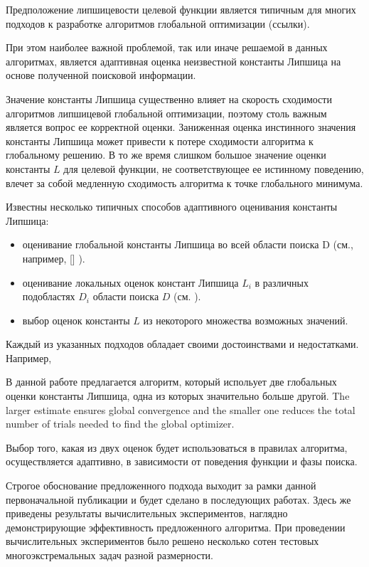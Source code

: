 \documentclass[runningheads]{llncs}
\begin{document}
Предположение липшицевости целевой функции является типичным для многих подходов к разработке алгоритмов глобальной оптимизации (ссылки). 


При этом наиболее важной проблемой, так или иначе решаемой в данных алгоритмах, является адаптивная оценка неизвестной константы Липшица на основе полученной поисковой информации. 

Значение константы Липшица существенно влияет на скорость сходимости алгоритмов липшицевой глобальной оптимизации, поэтому столь важным является вопрос ее корректной оценки. Заниженная оценка инстинного значения константы Липшица может привести к потере сходимости алгоритма к глобальному решению. В то же время слишком большое значение оценки константы $L$ для целевой функции, %
не соответствующее ее истинному поведению, влечет за собой медленную сходимость алгоритма к точке глобального минимума. 

Известны несколько типичных способов адаптивного оценивания константы Липшица:
\begin{itemize}
	\item оценивание глобальной константы Липшица во всей области поиска D (см., например, [] ).
	\item оценивание локальных оценок констант Липшица $L_i$ в различных подобластях $D_i$ области поиска $D$ (см. ).
	\item выбор оценок константы $L$ из некоторого множества возможных значений.
\end{itemize}

Каждый из указанных подходов обладает своими достоинствами и недостатками. Например, 

В данной работе предлагается алгоритм, который испольует две глобальных оценки константы Липшица, одна из которых значительно больше другой. 
The larger estimate ensures global convergence and the smaller one reduces the total number of trials needed to find the global optimizer.


Выбор того, какая из двух оценок будет использоваться в правилах алгоритма, осуществляется адаптивно, в зависимости от поведения функции и фазы поиска.

Строгое обоснование предложенного подхода выходит за рамки данной первоначальной публикации и будет сделано в последующих работах. Здесь же приведены результаты вычислительных экспериментов, наглядно демонстрирующие эффективность предложенного алгоритма. При проведении вычислительных экспериментов было решено несколько сотен тестовых многоэкстремальных задач разной размерности.
 
\end{document}
